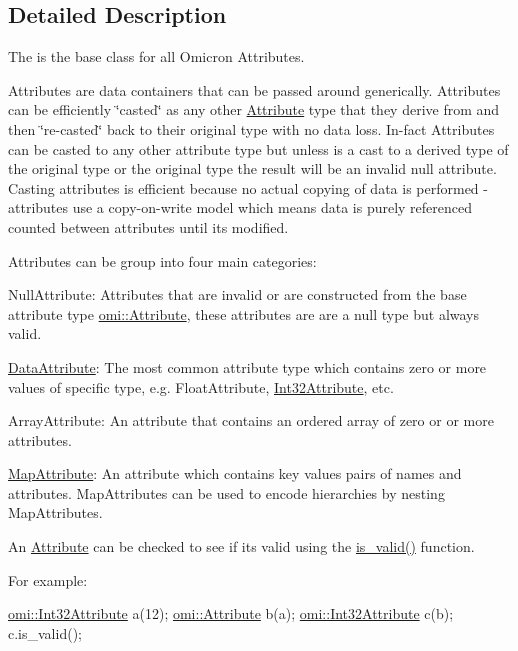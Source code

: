 \subsection{Detailed Description}
The is the base class for all Omicron Attributes. 

Attributes are data containers that can be passed around generically. Attributes can be efficiently \char`\"{}casted\char`\"{} as any other \hyperlink{classomi_1_1_attribute}{Attribute} type that they derive from and then \char`\"{}re-\/casted\char`\"{} back to their original type with no data loss. In-\/fact Attributes can be casted to any other attribute type but unless is a cast to a derived type of the original type or the original type the result will be an invalid null attribute. Casting attributes is efficient because no actual copying of data is performed -\/ attributes use a copy-\/on-\/write model which means data is purely referenced counted between attributes until it\textquotesingle{}s modified.

Attributes can be group into four main categories\+:
\begin{DoxyItemize}
\item Null\+Attribute\+: Attributes that are invalid or are constructed from the base attribute type \hyperlink{classomi_1_1_attribute}{omi\+::\+Attribute}, these attributes are are a null type but always valid.
\item \hyperlink{classomi_1_1_data_attribute}{Data\+Attribute}\+: The most common attribute type which contains zero or more values of specific type, e.\+g. Float\+Attribute, \hyperlink{classomi_1_1_int32_attribute}{Int32\+Attribute}, etc.
\item Array\+Attribute\+: An attribute that contains an ordered array of zero or or more attributes.
\item \hyperlink{classomi_1_1_map_attribute}{Map\+Attribute}\+: An attribute which contains key values pairs of names and attributes. Map\+Attributes can be used to encode hierarchies by nesting Map\+Attributes.
\end{DoxyItemize}

An \hyperlink{classomi_1_1_attribute}{Attribute} can be checked to see if it\textquotesingle{}s valid using the \hyperlink{classomi_1_1_attribute_aa4b45d4043cffdd1c729c1d89a484324}{is\+\_\+valid()} function.

For example\+:


\begin{DoxyCode}
\hyperlink{classomi_1_1_int32_attribute}{omi::Int32Attribute} a(12);
\hyperlink{classomi_1_1_attribute}{omi::Attribute} b(a);
\hyperlink{classomi_1_1_int32_attribute}{omi::Int32Attribute} c(b);
c.is\_valid();
\end{DoxyCode}


